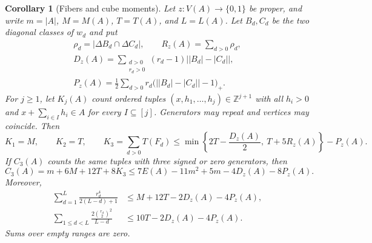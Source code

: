 \documentclass[11pt,a4paper]{article}
\newtheorem{corollary}[theorem]{Corollary}
\theoremstyle{definition}
\newcommand{\Z}{\mathbb Z}
\numberwithin{equation}{section}
\begin{document}
\begin{corollary}[Fibers and cube moments]\label{cor:moments}
Let $z:V(A)\to\{0,1\}$ be proper, and write $m=|A|$,
$M=M(A)$, $T=T(A)$, and $L=L(A)$.
Let $B_d,C_d$ be the two diagonal classes of $w_d$ and put
\begin{equation}\label{eq:fiber-deficits}
\begin{gathered}
\rho_d=|\Delta B_d\cap\Delta C_d|,\qquad R_z(A)=\sum_{d>0}\rho_d,\\
D_z(A)=\sum_{\substack{d>0\\r_d>0}}(r_d-1)\bigl||B_d|-|C_d|\bigr|,\\
P_z(A)=\frac12\sum_{d>0}r_d\bigl(\bigl||B_d|-|C_d|\bigr|-1\bigr)_+.
\end{gathered}
\end{equation}
For $j\ge1$, let $K_j(A)$ count ordered tuples
$(x,h_1,\ldots,h_j)\in\Z^{j+1}$ with all $h_i>0$ and
$x+\sum_{i\in I}h_i\in A$ for every $I\subseteq[j]$.
Generators may repeat and vertices may coincide. Then
\begin{equation}\label{eq:cube-moments}
K_1=M,\qquad K_2=T,\qquad
K_3=\sum_{d>0}T(F_d)\le
\min\left\{2T-\frac{D_z(A)}2,\ T+5R_z(A)\right\}-P_z(A).
\end{equation}
If $C_3(A)$ counts the same tuples with three signed or zero generators,
then
\begin{equation}\label{eq:signed-cube-moment}
C_3(A)=m+6M+12T+8K_3
\le7E(A)-11m^2+5m-4D_z(A)-8P_z(A).
\end{equation}
Moreover,
\begin{align}
\sum_{d=1}^{L}\frac{r_d^4}{2(L-d)+1}
&\le M+12T-2D_z(A)-4P_z(A),\label{eq:fiber-fourth-moment}\\
\sum_{1\le d<L}\frac{2\binom{r_d}{2}^{\!2}}{L-d}
&\le10T-2D_z(A)-4P_z(A).\label{eq:fiber-zero-separated}
\end{align}
Sums over empty ranges are zero.
\end{corollary}
\end{document}

